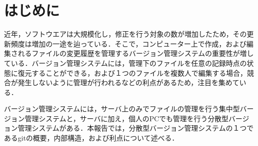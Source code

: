 \documentclass[a4j,9pt,twocolumn]{jsarticle}
\begin{document}


\section{はじめに}
近年，ソフトウエアは大規模化し，修正を行う対象の数が増加したため，その更新頻度は増加の一途を辿っている．そこで，コンピューター上で作成，および編集されるファイルの変更履歴を管理するバージョン管理システムの重要性が増している．バージョン管理システムには，管理下のファイルを任意の記録時点の状態に復元することができる，および１つのファイルを複数人で編集する場合，競合が発生しないように管理が行われるなどの利点があるため，注目を集めている\cite{pop}．

バージョン管理システムには，サーバ上のみでファイルの管理を行う集中型バージョン管理システムと，サーバに加え，個人のPCでも管理を行う分散型バージョン管理システムがある．本報告では，分散型バージョン管理システムの１つであるgitの概要，内部構造，および利点について述べる．
\end{document}
